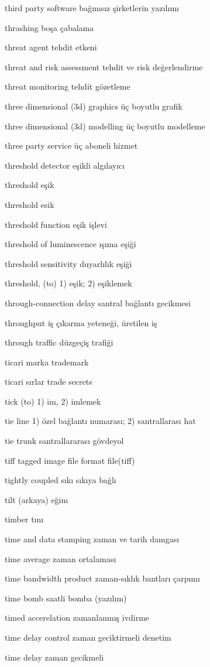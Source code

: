 \documentclass[12pt,fleqn]{article}\usepackage{../../common}
\begin{document}
third party software bağımsız şirketlerin yazılımı

thrashing boşa çabalama

threat agent tehdit etkeni

threat and risk assessment tehdit ve risk değerlendirme

threat monitoring tehdit gözetleme

three dimensional (3d) graphics üç boyutlu grafik

three dimensional (3d) modelling üç boyutlu modelleme

three party service üç aboneli hizmet

threshold detector eşikli algılayıcı

threshold eşik

threshold esik

threshold function eşik işlevi

threshold of luminescence ışıma eşiği

threshold sensitivity duyarlılık eşiği

threshold, (to) 1) eşik; 2) eşiklemek

through-connection delay santral bağlantı gecikmesi

throughput iş çıkarma yeteneği, üretilen iş

through traffic düzgeçiş trafiği

ticari marka trademark

ticari sırlar trade secrets

tick (to) 1) im, 2) imlemek

tie line 1) özel bağlantı numarası; 2) santrallarası hat

tie trunk santrallararası gövdeyol

tiff tagged image file format file(tiff)

tightly coupled sıkı sıkıya bağlı

tilt (arkaya) eğim

timber tını

time and data stamping zaman ve tarih damgası

time average zaman ortalaması

time bandwidth product zaman-sıklık bantları çarpımı

time bomb saatli bomba (yazılım)

timed accerelation zamanlanmış ivdirme

time delay control zaman geciktirmeli denetim

time delay zaman gecikmeli
\end{document}
